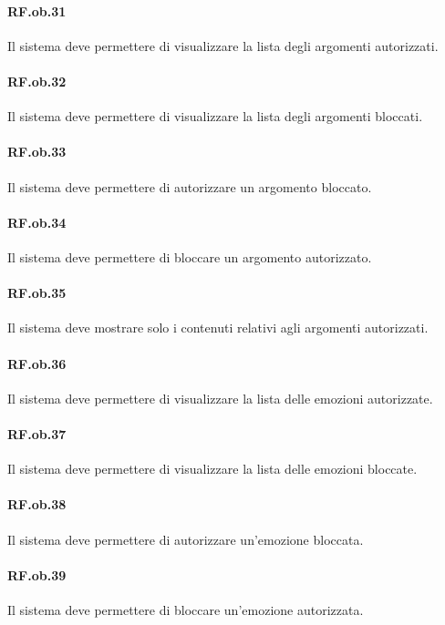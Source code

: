 \documentclass[10pt,a4paper,headinclude,footinclude,hidelinks]{scrreprt} %
\begin{document}
	\paragraph{RF.ob.31} Il sistema deve permettere di visualizzare la lista degli argomenti autorizzati.

	\paragraph{RF.ob.32} Il sistema deve permettere di visualizzare la lista degli argomenti bloccati.

	\paragraph{RF.ob.33} Il sistema deve permettere di autorizzare un argomento bloccato.

	\paragraph{RF.ob.34} Il sistema deve permettere di bloccare un argomento autorizzato.

	\paragraph{RF.ob.35} Il sistema deve mostrare solo i contenuti relativi agli argomenti autorizzati.

	\paragraph{RF.ob.36} Il sistema deve permettere di visualizzare la lista delle emozioni autorizzate.

	\paragraph{RF.ob.37} Il sistema deve permettere di visualizzare la lista delle emozioni bloccate.

	\paragraph{RF.ob.38} Il sistema deve permettere di autorizzare un'emozione bloccata.

	\paragraph{RF.ob.39} Il sistema deve permettere di bloccare un'emozione autorizzata.
\end{document}

